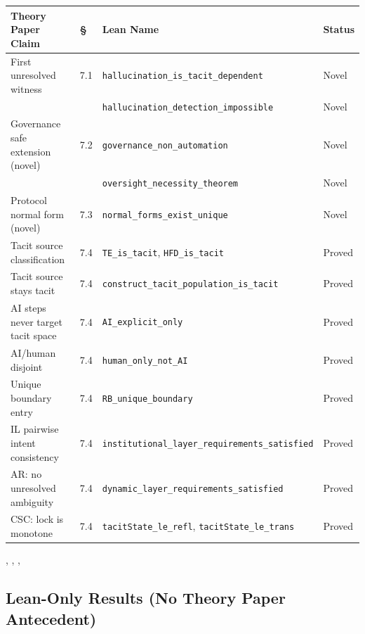 \begin{center}
\begin{tabular}{p{5.2cm}lp{5.2cm}l}
\toprule
Theory Paper Claim & \S & Lean Name & Status \\
\midrule
First unresolved witness
  & 7.1 & \texttt{hallucination\_is\_tacit\_dependent}  & Novel \\
  &     & \texttt{hallucination\_detection\_impossible} & Novel \\
Governance safe extension (novel)
  & 7.2 & \texttt{governance\_non\_automation}          & Novel \\
  &     & \texttt{oversight\_necessity\_theorem}        & Novel \\
Protocol normal form (novel)
  & 7.3 & \texttt{normal\_forms\_exist\_unique}         & Novel \\
Tacit source classification
  & 7.4 & \texttt{TE\_is\_tacit}, \texttt{HFD\_is\_tacit} & Proved \\
Tacit source stays tacit
  & 7.4 & \texttt{construct\_tacit\_population\_is\_tacit} & Proved \\
AI steps never target tacit space
  & 7.4 & \texttt{AI\_explicit\_only}                   & Proved \\
AI/human disjoint
  & 7.4 & \texttt{human\_only\_not\_AI}                 & Proved \\
Unique boundary entry
  & 7.4 & \texttt{RB\_unique\_boundary}                 & Proved \\
IL pairwise intent consistency
  & 7.4 & \texttt{institutional\_layer\_requirements\_satisfied} & Proved \\
AR: no unresolved ambiguity
  & 7.4 & \texttt{dynamic\_layer\_requirements\_satisfied} & Proved \\
CSC: lock is monotone
  & 7.4 & \texttt{tacitState\_le\_refl}, \texttt{tacitState\_le\_trans} & Proved \\
\bottomrule
\end{tabular}
\end{center}

\noindent{}, ,
, 

\subsection*{Lean-Only Results (No Theory Paper Antecedent)}

